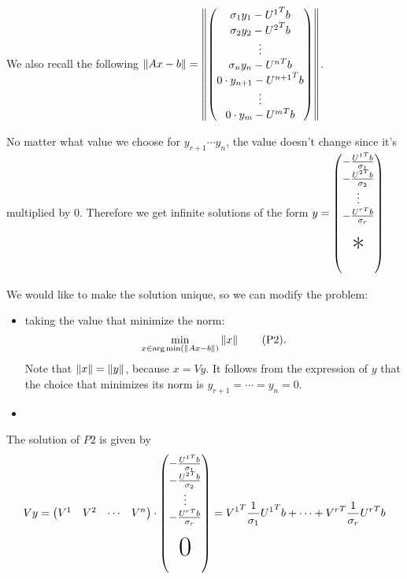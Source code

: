 \documentclass[computationalMathematics.tex]{subfiles}
\begin{document}
We also recall the following 
$\left\lVert Ax-b\right\rVert = \left\lVert
      \begin{pmatrix}
        \sigma_1 y_1 - {U^1}^{T}b\\
        \sigma_2 y_2 -{U^2}^{T}b\\
        \vdots\\
        \sigma_n y_n -{U^n}^{T}b\\
        0 \cdot y_{n+1} - {U^{n+1}}^{T}b\\
        \vdots\\
        0 \cdot y_m -{U^m}^{T}b\\
      \end{pmatrix}
    \right\rVert$.
    
No matter what value we choose for $y_{r+1} \cdots y_{n}$, the value doesn't change since it's multiplied by $0$.
 Therefore we get infinite solutions of the form $ y =
 \begin{pmatrix}
   -\frac{\tr{U^1} b}{\sigma_1}\\
    -\frac{\tr{U^2} b}{\sigma_2}\\
    \vdots\\
    -\frac{\tr{U^r} b}{\sigma_r}\\
    \\
    \text{\Huge{*}}\\
    \\
  \end{pmatrix}$

We would like to make the solution unique, so we can modify the problem:
  \begin{itemize}
    \item taking the value that minimize the norm:
    \begin{equation}
    	\min\limits_{x \in \arg\min(\left\lVert Ax-b\right\rVert)} \left\lVert x\right\rVert \tag{P2}.
    \end{equation}
Note that $\left\lVert x\right\rVert = \left\lVert y\right\rVert$, because $x = Vy$. It follows from the expression of $y$ that  the choice that minimizes its norm is $y_{r+1} = \cdots = y_{n} =0$.
    \item 
  \end{itemize}

  The solution of $P2$ is given by
  \[
    Vy = \begin{pmatrix} V^1 & V^2 & \cdots & V^{n} \end{pmatrix} \cdot \begin{pmatrix}
   -\frac{\tr{U^1} b}{\sigma_1}\\
    -\frac{\tr{U^2} b}{\sigma_2}\\
    \vdots\\
    -\frac{\tr{U^r} b}{\sigma_r}\\
    \\
    \text{\Huge{0}}\\
    \\
  \end{pmatrix}
  = \tr{V^1} \frac{1}{\sigma_1} \tr{U^1} b + \cdots + \tr{V^r} \frac{1}{\sigma_r} \tr{U^r} b
\]
\end{document}
